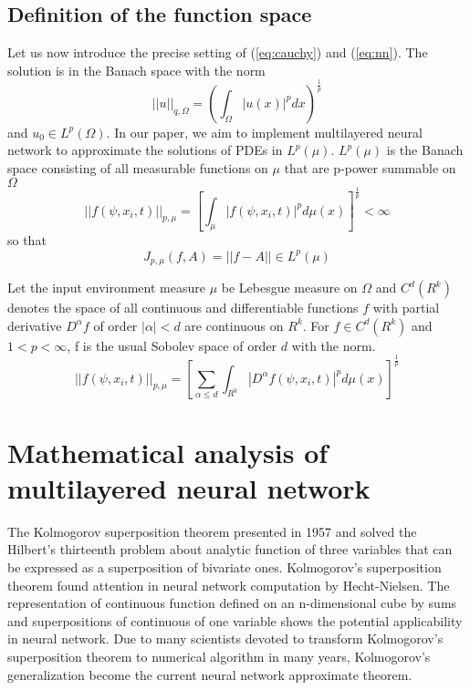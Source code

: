 \documentclass{article}
\begin{document}
		\subsection{Definition of the function space}
		Let us now introduce the precise setting of (\ref{eq:cauchy}) and (\ref{eq:nn}). The solution is in the Banach space with the norm
		\begin{equation}
		||u||_{q,\Omega} = \left(\int_{\Omega} |u(x)|^{p} dx\right)^{\frac{1}{p}}
		\end{equation}
		and $u_{0} \in L^{p}(\Omega)$. In our paper, we aim to implement multilayered neural network to approximate the solutions of PDEs in $L^{p}(\mu)$. $L^{p}(\mu)$ is the Banach space consisting of all measurable functions on $\mu$ that are p-power summable on $\Omega$
		\begin{equation}
		||f(\psi,x_i,t)||_{p,\mu} = \left[\int_{\mu} |f(\psi,x_i,t)|^{p} d\mu(x)\right]^{\frac{1}{p}} < \infty
		\end{equation}
		so that
		\begin{equation}
		J_{p,\mu}(f,A) = || f-A || \in L^{p}(\mu)
		\end{equation}

		Let the input environment measure $\mu$ be Lebesgue measure on $\Omega$ and $C^{d}(R^{k})$ denotes the space of all continuous and differentiable functions $f$ with partial derivative $D^{\alpha}f$ of order $|\alpha| < d$ are continuous on $R^{k}$.  For $f \in C^{d}(R^{k})$ and $1 < p < \infty$, f is the usual Sobolev space of order $d$ with the norm.
		\begin{equation}
		||f(\psi,x_i,t)||_{p,\mu} = \left[ \sum_{\alpha \leq d} \int_{R^{k}} |D^{\alpha}f(\psi,x_i,t)|^{p} d \mu(x)\right]^{\frac{1}{p}}
		\end{equation}



\section{Mathematical analysis of multilayered neural network}
 The Kolmogorov superposition theorem presented in 1957 and solved the Hilbert’s thirteenth problem \footnotemark about analytic function of three variables that can be expressed as a superposition of bivariate ones.  Kolmogorov’s superposition theorem found attention in neural network computation by Hecht{-}Nielsen\cite{nielsen}. The representation of continuous function defined on an n{-}dimensional cube by sums and superpositions of continuous of one variable shows the potential applicability in neural network\cite{kurkova}. Due to many scientists devoted to transform Kolmogorov’s superposition theorem to numerical algorithm in many years, Kolmogorov’s generalization become the current neural network approximate theorem.
\end{document}
